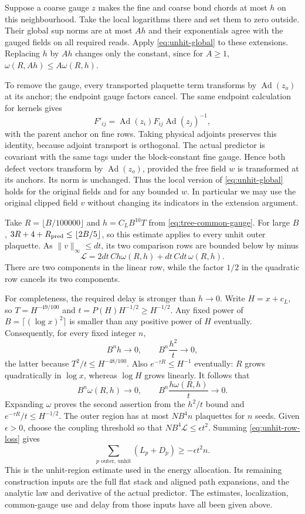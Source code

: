 Suppose a coarse gauge $z$ makes the fine and coarse bond chords
at most $h$ on this neighbourhood. Take the local logarithms there
and set them to zero outside. Their global sup norms are at most
$Ah$ and their exponentials agree with the gauged fields on all
required reads. Apply \eqref{eq:unhit-global} to these extensions.
Replacing $h$ by $Ah$ changes only the constant, since for $A\ge1$,
$\omega(R,Ah)\le A\omega(R,h)$.

To remove the gauge, every transported plaquette term transforms
by $\operatorname{Ad}(z_o)$ at its anchor; the endpoint gauge
factors cancel. The same endpoint calculation for kernels gives
\[
 F'_{ij}=\operatorname{Ad}(z_i)F_{ij}\operatorname{Ad}(z_j)^{-1},
\]
with the parent anchor on fine rows. Taking physical adjoints
preserves this identity, because adjoint transport is orthogonal.
The actual predictor is covariant with the same tags under the
block-constant fine gauge. Hence both defect vectors transform by
$\operatorname{Ad}(z_o)$, provided the free field $w$ is transformed
at its anchors. Its norm is unchanged. Thus the local version of
\eqref{eq:unhit-global} holds for the original fields and for any
bounded $w$. In particular we may use the original clipped field
$v$ without changing its indicators in the extension argument.

Take $R=\lfloor B/100000\rfloor$ and
$h=C_LB^{10}T$ from \eqref{eq:tree-common-gauge}. For large $B$,
$3R+4+R_{\rm pred}\le\lfloor2B/5\rfloor$, so this estimate applies
to every unhit outer plaquette. As $\|v\|_\infty\le dt$, its two
comparison rows are bounded below by minus
\begin{equation}\label{eq:unhit-row-loss}
 \mathcal L=2dt\,Ch\omega(R,h)+dt\,Cdt\,\omega(R,h).
\end{equation}
There are two components in the linear row, while the factor $1/2$
in the quadratic row cancels its two components.

For completeness, the required delay is stronger than $h\to0$.
Write $H=x+c_L$, so $T=H^{-49/100}$ and
$t=P(H)H^{-1/2}\ge H^{-1/2}$. Any fixed power of
$B=\lceil(\log x)^2\rceil$ is smaller than any positive power of
$H$ eventually. Consequently, for every fixed integer $n$,
\[
 B^n h\longrightarrow0,\qquad
 B^n\frac{h^2}{t}\longrightarrow0,
\]
the latter because $T^2/t\le H^{-48/100}$. Also
$e^{-\tau R}\le H^{-1}$ eventually: $R$ grows quadratically in
$\log x$, whereas $\log H$ grows linearly. It follows that
\[
 B^n\omega(R,h)\longrightarrow0,\qquad
 B^n\frac{h\omega(R,h)}t\longrightarrow0.
\]
Expanding $\omega$ proves the second assertion from the $h^2/t$
bound and $e^{-\tau R}/t\le H^{-1/2}$. The outer region has at most
$NB^4n$ plaquettes for $n$ seeds. Given $\epsilon>0$, choose the
coupling threshold so that $NB^4\mathcal L\le\epsilon t^2$.
Summing \eqref{eq:unhit-row-loss} gives
\begin{equation}\label{eq:unhit-final}
 \sum_{p\text{ outer, unhit}}(L_p+D_p)\ge-\epsilon t^2 n.
\end{equation}
This is the unhit-region estimate used in the energy allocation.
Its remaining construction inputs are the full flat stack and aligned
path expansions, and the analytic law and derivative of the actual
predictor. The estimates, localization, common-gauge use and delay
from those inputs have all been given above.
